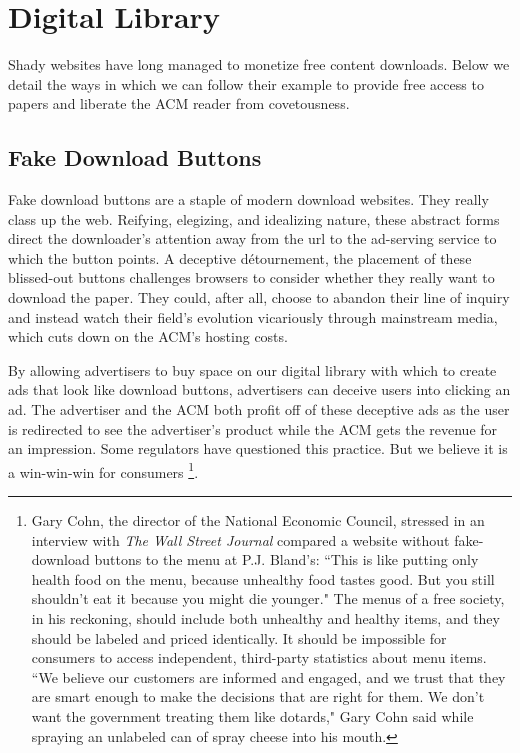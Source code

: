 \section{Digital Library}
\label{sec:lib}
Shady websites have long managed to monetize free content downloads.
Below we detail the ways in which we can follow their example to provide free
access to papers and liberate the ACM reader from covetousness.

\subsection{Fake Download Buttons}
\label{sec:fake}

Fake download buttons are a staple of modern download websites. They really
class up the web. Reifying, elegizing, and idealizing nature, these abstract
forms  direct the downloader's attention away from the url
to the ad-serving service to which the button points. A deceptive
d\'{e}tournement, the placement of these blissed-out buttons
challenges browsers to consider whether they really want to download the paper.
They could, after all, choose to abandon their line of inquiry and instead
watch their field's evolution vicariously through mainstream media, which cuts
down on the ACM's hosting costs.

By allowing advertisers to buy space on our digital library with which to
create ads that look like download buttons, advertisers can deceive users into
clicking an ad.
The advertiser and the ACM both profit off of these deceptive ads as the user
is redirected to see the advertiser's product while the ACM gets the revenue
for an impression. Some regulators have questioned this practice. But we
believe it is a win-win-win for consumers \footnote{Gary Cohn, the director of
  the National Economic Council, stressed in an interview with \textit{The Wall
Street Journal} compared a website without fake-download buttons to the menu at
P.J. Bland's: ``This is like putting only health food on the menu, because
unhealthy food tastes good. But you still shouldn't eat it because you might
die younger." The menus of a free society, in his reckoning, should include
both unhealthy and healthy items, and they should be labeled and priced
identically. It should be impossible for consumers to access independent,
third-party statistics about menu items. ``We believe our customers are
informed and engaged, and we trust that they are smart enough to make the
decisions that are right for them. We don't want the government treating them
like dotards," Gary Cohn said while spraying an unlabeled can of spray cheese
into his mouth.}.


